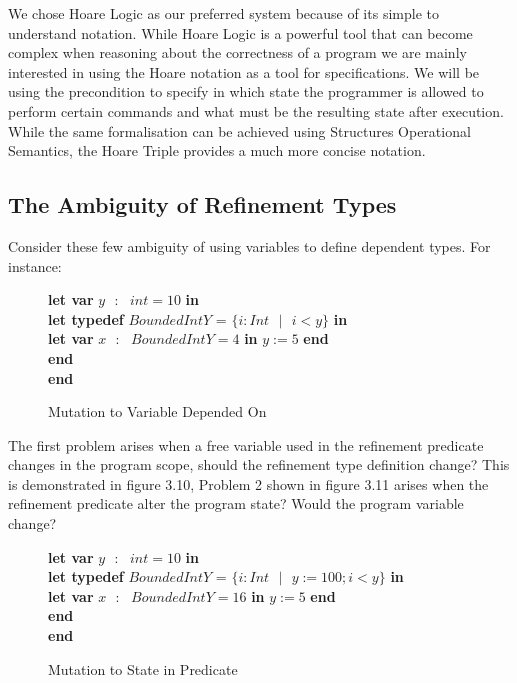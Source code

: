 \documentclass[a4paper,12pt]{report}
\newenvironment{tabs}[1]
 {\flushleft\TabPositions{#1}}
 {\endflushleft}
\begin{document}
\par
We chose Hoare Logic as our preferred system because of its simple to understand 
notation. While Hoare Logic is a powerful tool that can become complex when 
reasoning about the correctness of a program we are mainly interested in using 
the Hoare notation as a tool for specifications. We will be using the 
precondition to specify in which state the programmer is allowed to perform 
certain commands and what must be the resulting state after execution. While the 
same formalisation can be achieved using Structures Operational Semantics, the 
Hoare Triple provides a much more concise notation. 


\subsection{The Ambiguity of Refinement Types}
Consider these few ambiguity of using variables to define dependent types. For 
instance: 

\begin{figure} [H]
  \begin{tabs}{1cm,2cm}
    \textbf{let var }$y\text{ }:\text{ } int = 10$ \textbf{ in } \\
    \tab\textbf{let typedef }$BoundedIntY$ = $\{i : Int\text{ }|\text{ } i < y\}$ \textbf{ in } \\ 
    \tab\tab\textbf{let var }$x\text{ }:\text{ }BoundedIntY = 4$ \textbf{ in }$y := 5$\textbf { end} \\
    \tab\textbf {end} \\
    \textbf{end}
  \end{tabs}  
  \caption{Mutation to Variable Depended On}
\end{figure}

\par
The first problem arises when a free variable used in the refinement predicate 
changes in the program scope, should the refinement type definition change? 
This is demonstrated in figure 3.10, Problem 2 shown in figure 3.11 
arises when the refinement predicate alter the program state? Would the program 
variable change?


\begin{figure} [H]
  \begin{tabs}{1cm,2cm}
    \textbf{let var }$y\text{ }:\text{ } int = 10$ \textbf{ in } \\
    \tab\textbf{let typedef }$BoundedIntY$ = $\{i : Int\text{ }|\text{ } y := 100;i < y\}$ \textbf{ in } \\ 
    \tab\tab\textbf{let var }$x\text{ }:\text{ }BoundedIntY = 16$ \textbf{ in }$y := 5$\textbf { end} \\
    \tab\textbf {end} \\
    \textbf{end}
  \end{tabs}  
  \caption{Mutation to State in Predicate}
\end{figure}
\end{document}
